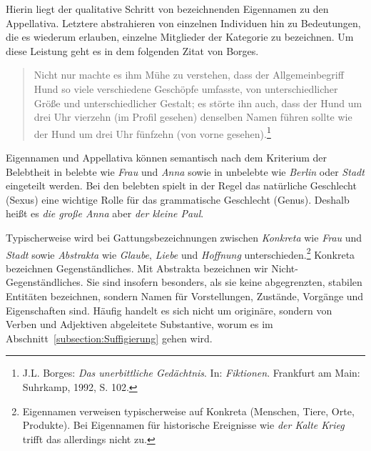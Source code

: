 Hierin liegt der qualitative Schritt von bezeichnenden Eigennamen zu den Appellativa. Letztere abstrahieren von einzelnen Individuen hin zu Bedeutungen, die es wiederum erlauben, einzelne Mitglieder der Kategorie zu bezeichnen. Um diese Leistung geht es in dem folgenden Zitat von Borges.  

\begin{quote}
    Nicht nur machte es ihm Mühe zu verstehen, dass der Allgemeinbegriff Hund so viele verschiedene Geschöpfe umfasste, von unterschiedlicher Größe und unterschiedlicher Gestalt; es störte ihn auch, dass der Hund um drei Uhr vierzehn (im Profil gesehen) denselben Namen führen sollte wie der Hund um drei Uhr fünfzehn (von vorne gesehen).\footnote{J.L. Borges: \textit{Das unerbittliche Gedächtnis}. In: \textit{Fiktionen}. Frankfurt am Main: Suhrkamp, 1992, S. 102.}
\end{quote} 

Eigennamen und Appellativa können semantisch nach dem Kriterium der Belebtheit in belebte wie \textit{Frau} und \textit{Anna} sowie in unbelebte wie \textit{Berlin} oder \textit{Stadt} eingeteilt werden. Bei den belebten spielt in der Regel das natürliche Geschlecht (Sexus) eine wichtige Rolle für das grammatische Geschlecht (Genus). Deshalb heißt es \textit{die große Anna} aber \textit{der kleine Paul}.

Typischerweise wird bei Gattungsbezeichnungen zwischen \textit{Konkreta} wie \textit{Frau} und \textit{Stadt} sowie \textit{Abstrakta} wie \textit{Glaube}, \textit{Liebe} und \textit{Hoffnung} unterschieden.\footnote{Eigennamen verweisen typischerweise auf Konkreta (Menschen, Tiere, Orte, Produkte). Bei Eigennamen für historische Ereignisse wie \textit{der Kalte Krieg} trifft das allerdings nicht zu.} Konkreta bezeichnen Gegenständliches. Mit Abstrakta bezeichnen wir Nicht-Gegenständliches. Sie sind insofern besonders, als sie keine abgegrenzten, stabilen Entitäten bezeichnen, sondern Namen für Vorstellungen, Zustände, Vorgänge und Eigenschaften sind. Häufig handelt es sich nicht um originäre, sondern von Verben und Adjektiven abgeleitete Substantive, worum es im Abschnitt~\ref{subsection:Suffigierung} gehen wird.

